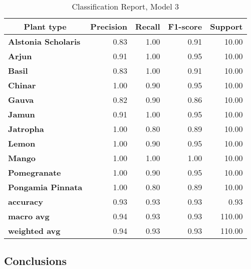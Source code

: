 \documentclass[11pt]{article}
\begin{document}
\begin{table}[H]
\centering
\begin{tabular}{lrrrr}
\toprule
\multicolumn{1}{c}{\textbf{Plant type}} & \multicolumn{1}{c}{\textbf{Precision}} & \multicolumn{1}{c}{\textbf{Recall}} & \multicolumn{1}{c}{\textbf{F1-score}} & \multicolumn{1}{c}{\textbf{Support}}\\
\midrule
\textbf{Alstonia Scholaris} &       0.83 &    1.00 &      0.91 &    10.00 \\
\textbf{Arjun             } &       0.91 &    1.00 &      0.95 &    10.00 \\
\textbf{Basil             } &       0.83 &    1.00 &      0.91 &    10.00 \\
\textbf{Chinar            } &       1.00 &    0.90 &      0.95 &    10.00 \\
\textbf{Gauva             } &       0.82 &    0.90 &      0.86 &    10.00 \\
\textbf{Jamun             } &       0.91 &    1.00 &      0.95 &    10.00 \\
\textbf{Jatropha          } &       1.00 &    0.80 &      0.89 &    10.00 \\
\textbf{Lemon             } &       1.00 &    0.90 &      0.95 &    10.00 \\
\textbf{Mango             } &       1.00 &    1.00 &      1.00 &    10.00 \\
\textbf{Pomegranate       } &       1.00 &    0.90 &      0.95 &    10.00 \\
\textbf{Pongamia Pinnata  } &       1.00 &    0.80 &      0.89 &    10.00 \\ \hline
\textbf{accuracy          } &       0.93 &    0.93 &      0.93 &     0.93 \\
\textbf{macro avg         } &       0.94 &    0.93 &      0.93 &   110.00 \\
\textbf{weighted avg      } &       0.94 &    0.93 &      0.93 &   110.00 \\
\bottomrule
\end{tabular}
\caption{Classification Report, Model 3}\label{report_model1}
\end{table}

\clearpage

\begin{center}
    \section{Conclusions}
    \label{Results}
\end{center}
\end{document}
